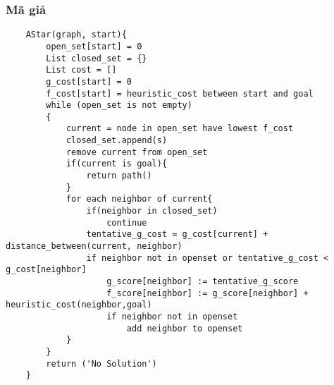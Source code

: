 \documentclass{article}
\begin{document}
\subsubsection{Mã giả}
\begin{verbatim}
    AStar(graph, start){
        open_set[start] = 0
        List closed_set = {}
        List cost = []
        g_cost[start] = 0
        f_cost[start] = heuristic_cost between start and goal
        while (open_set is not empty)
        {
            current = node in open_set have lowest f_cost
            closed_set.append(s)  
            remove current from open_set
            if(current is goal){
                return path()
            }
            for each neighbor of current{
                if(neighbor in closed_set)
                    continue
                tentative_g_cost = g_cost[current] + distance_between(current, neighbor)
                if neighbor not in openset or tentative_g_cost < g_cost[neighbor] 
                    g_score[neighbor] := tentative_g_score
                    f_score[neighbor] := g_score[neighbor] + heuristic_cost(neighbor,goal)
                    if neighbor not in openset
                        add neighbor to openset 
            }
        } 
        return ('No Solution')
    }
\end{verbatim}
\end{document}
